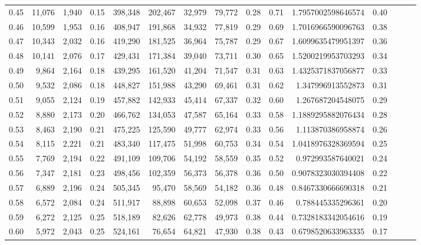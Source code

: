 \begin{tabular}{rrrrrrrrrrrrrrr}
0.45 &  11,076 &  1,940 &  0.15 &  398,348 &  202,467 &   32,979 &   79,772 &  0.28 &  0.71 &    1.7957002598646574 &      0.40 \\
0.46 &  10,599 &  1,953 &  0.16 &  408,947 &  191,868 &   34,932 &   77,819 &  0.29 &  0.69 &    1.7016966590096763 &      0.38 \\
0.47 &  10,343 &  2,032 &  0.16 &  419,290 &  181,525 &   36,964 &   75,787 &  0.29 &  0.67 &    1.6099635479951397 &      0.36 \\
0.48 &  10,141 &  2,076 &  0.17 &  429,431 &  171,384 &   39,040 &   73,711 &  0.30 &  0.65 &    1.5200219953703293 &      0.34 \\
0.49 &   9,864 &  2,164 &  0.18 &  439,295 &  161,520 &   41,204 &   71,547 &  0.31 &  0.63 &    1.4325371837056877 &      0.33 \\
0.50 &   9,532 &  2,086 &  0.18 &  448,827 &  151,988 &   43,290 &   69,461 &  0.31 &  0.62 &     1.347996913552873 &      0.31 \\
0.51 &   9,055 &  2,124 &  0.19 &  457,882 &  142,933 &   45,414 &   67,337 &  0.32 &  0.60 &     1.267687204548075 &      0.29 \\
0.52 &   8,880 &  2,173 &  0.20 &  466,762 &  134,053 &   47,587 &   65,164 &  0.33 &  0.58 &    1.1889295882076434 &      0.28 \\
0.53 &   8,463 &  2,190 &  0.21 &  475,225 &  125,590 &   49,777 &   62,974 &  0.33 &  0.56 &     1.113870386958874 &      0.26 \\
0.54 &   8,115 &  2,221 &  0.21 &  483,340 &  117,475 &   51,998 &   60,753 &  0.34 &  0.54 &    1.0418976328369594 &      0.25 \\
0.55 &   7,769 &  2,194 &  0.22 &  491,109 &  109,706 &   54,192 &   58,559 &  0.35 &  0.52 &     0.972993587640021 &      0.24 \\
0.56 &   7,347 &  2,181 &  0.23 &  498,456 &  102,359 &   56,373 &   56,378 &  0.36 &  0.50 &    0.9078323030394408 &      0.22 \\
0.57 &   6,889 &  2,196 &  0.24 &  505,345 &   95,470 &   58,569 &   54,182 &  0.36 &  0.48 &    0.8467330666690318 &      0.21 \\
0.58 &   6,572 &  2,084 &  0.24 &  511,917 &   88,898 &   60,653 &   52,098 &  0.37 &  0.46 &     0.788445335296361 &      0.20 \\
0.59 &   6,272 &  2,125 &  0.25 &  518,189 &   82,626 &   62,778 &   49,973 &  0.38 &  0.44 &    0.7328183342054616 &      0.19 \\
0.60 &   5,972 &  2,043 &  0.25 &  524,161 &   76,654 &   64,821 &   47,930 &  0.38 &  0.43 &    0.6798520633963335 &      0.17 \\

\end{tabular}
